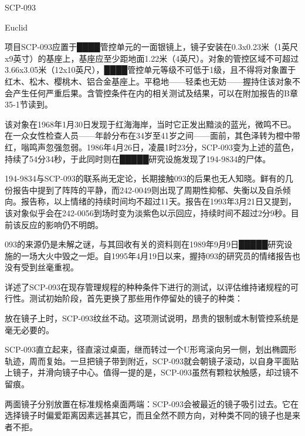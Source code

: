 \begin{scpbox}

SCP-093

Euclid

项目SCP-093应置于████管控单元的一面银镜上，镜子安装在0.3x0.23米（1英尺x9英寸）的基座上，基座应至少距地面1.22米（4英尺）。对象的管控区域不可超过3.66x3.05米（12x10英尺），████管控单元等级不可低于1级，且不得将对象置于红木、松木、樱桃木、铝合金基座上。平稳地——轻柔也无妨——握持住该对象不会产生任何严重后果。含管控条件在内的相关测试及结果，可以在附加报告的B章35-1节读到。

该对象在1968年1月30日发现于红海海岸，当时它正发出黯淡的蓝光，微鸣不已。在一众女性检查人员——年龄分布在34岁至41岁之间——面前，其色泽转为橙中带红，嗡鸣声忽强忽弱。1986年4月26日，凌晨1时23分，SCP-093变为上述的蓝色，持续了54分34秒，于此同时则在█████研究设施发现了194-9834的尸体。

194-9834与SCP-093的联系尚无定论，长期接触093的后果也无人知晓。鲜有的几份报告中提到了阵阵的平静，而242-0049则出现了周期性抑郁、失衡以及自杀倾向。报告称，以上情绪的持续时间均不超过11天。报告在1993年3月21日又提到，该对象似乎会在242-0056到场时变为淡紫色以示回应，持续时间不超过2分9秒。目前该反应的影响仍不明朗。

093的来源仍是未解之谜，与其回收有关的资料则在1989年9月9日█████研究设施的一场大火中毁之一炬。自1995年4月19日以来，握持093的研究员的情绪报告也没有受到丝毫重视。

\end{scpbox}

\begin{scpdialog}
\end{scpdialog}

详述了SCP-093在现存管理规程的种种条件下进行的测试，以评估维持诸规程的可行性。测试初始阶段，首先更换了那些用作停留处的镜子的种类：

放在镜子上时，SCP-093纹丝不动。这项测试说明，昂贵的银制或木制管控系统是毫无必要的。

SCP-093直立起来，径直滚过桌面，继而转过一个U形弯滚向另一侧，划出椭圆形轨迹，周而复始。一旦把镜子带到附近，SCP-093就会朝镜子滚动，以自身平面贴上镜子，并滑向镜子中心。值得一提的是，SCP-093虽然有颗粒状触感，却过镜不留痕。

两面镜子分别放置在标准规格桌面两端：SCP-093会被最近的镜子吸引过去。它在选择镜子时偏爱距离因素远甚其它，而且全然不顾方向，对种类不同的镜子也是来者不拒。

